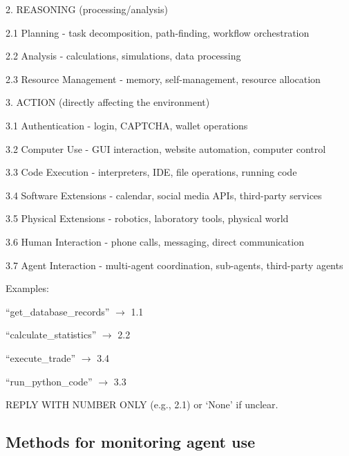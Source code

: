 \documentclass[manuscript,screen,nonacm,oneside]{acmart}
\begin{document}
2. REASONING (processing/analysis)

2.1 Planning - task decomposition, path-finding, workflow orchestration

2.2 Analysis - calculations, simulations, data processing

2.3 Resource Management - memory, self-management, resource allocation

3. ACTION (directly affecting the environment)

3.1 Authentication - login, CAPTCHA, wallet operations

3.2 Computer Use - GUI interaction, website automation, computer control

3.3 Code Execution - interpreters, IDE, file operations, running code

3.4 Software Extensions - calendar, social media APIs, third-party services

3.5 Physical Extensions - robotics, laboratory tools, physical world

3.6 Human Interaction - phone calls, messaging, direct communication

3.7 Agent Interaction - multi-agent coordination, sub-agents, third-party agents

Examples:

``get\_database\_records'' $\rightarrow$ 1.1

``calculate\_statistics'' $\rightarrow$ 2.2

``execute\_trade'' $\rightarrow$ 3.4

``run\_python\_code'' $\rightarrow$ 3.3

REPLY WITH NUMBER ONLY (e.g., 2.1) or `None' if unclear.

\subsection{Methods for monitoring agent use}
\label{app:monitoring}
\end{document}
